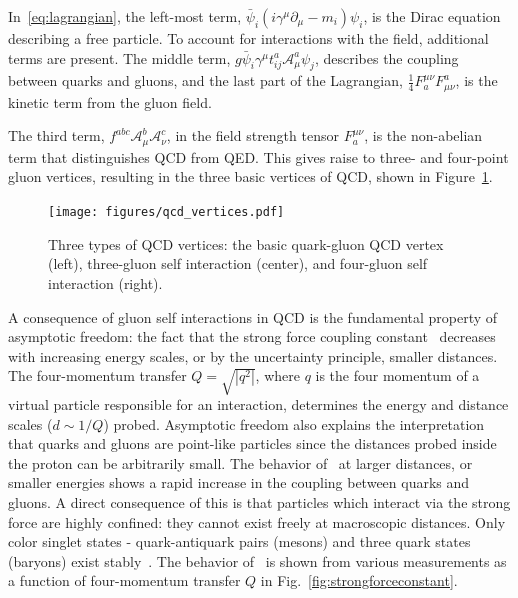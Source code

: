 In~\ref{eq:lagrangian}, the left-most term, $\bar{\psi}_{i}(i\gamma^{\mu}\partial_{\mu}-m_{i})\psi_{i}$, is the Dirac equation describing a free particle. To account for interactions with the field, additional terms are present. The middle term, $g\bar{\psi}_{i}\gamma^{\mu}t_{ij}^{a}\mathcal{A}_{\mu}^{a}\psi_{j}$, describes the coupling between quarks and gluons, and the last part of the Lagrangian, $\frac{1}{4}F^{\mu\nu}_{a}F_{\mu\nu}^{a}$, is the kinetic term from the gluon field. 

The third term, $f^{abc}\mathcal{A}_{\mu}^{b}\mathcal{A}_{\nu}^{c}$, in the field strength tensor $F^{\mu\nu}_{a}$, is the non-abelian term that distinguishes QCD from QED. This gives raise to three- and four-point gluon vertices, resulting in the three basic vertices of QCD, shown in Figure~\ref{fig:qcdvertices}. 

\begin{figure}
	\centerline{
		\texttt{[image: figures/qcd\_vertices.pdf]} 
	}
	\caption{Three types of QCD vertices: the basic quark-gluon QCD vertex (left), three-gluon self interaction (center), and four-gluon self interaction (right). }
	\label{fig:qcdvertices}
\end{figure}

A consequence of gluon self interactions in QCD is the fundamental property of asymptotic freedom: the fact that the strong force coupling constant \alphaqs\ decreases with increasing energy scales, or by the uncertainty principle, smaller distances. The four-momentum transfer $Q=\sqrt{|q^{2}|}$, where $q$ is the four momentum of a virtual particle responsible for an interaction, determines the energy and distance scales ($d\sim 1/Q$) probed. Asymptotic freedom also explains the interpretation that quarks and gluons are point-like particles since the distances probed inside the proton can be arbitrarily small. The behavior of \alphaS\ at larger distances, or smaller energies shows a rapid increase in the coupling between quarks and gluons. A direct consequence of this is that particles which interact via the strong force are highly confined: they cannot exist freely at macroscopic distances. Only color singlet states - quark-antiquark pairs (mesons) and three quark states (baryons) exist stably~\cite{Seymour:2005hs}.  The behavior of \alphaS\ is shown from various measurements as a function of four-momentum transfer $Q$ in Fig.~\ref{fig:strongforceconstant}. 

